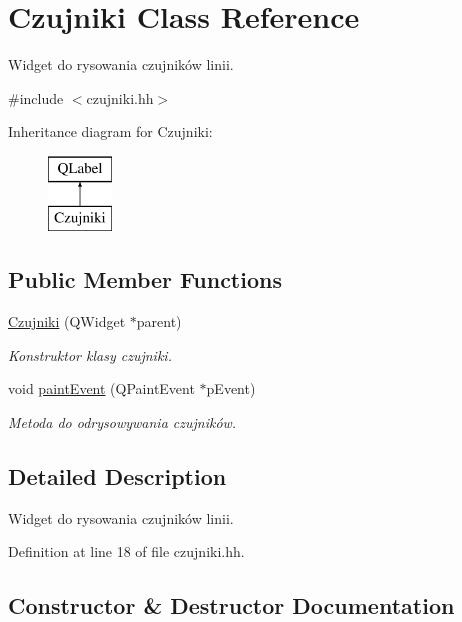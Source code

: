 \hypertarget{class_czujniki}{}\section{Czujniki Class Reference}
\label{class_czujniki}


Widget do rysowania czujników linii.  




{\ttfamily \#include $<$czujniki.\+hh$>$}

Inheritance diagram for Czujniki\+:\begin{figure}[H]
\begin{center}
\leavevmode
\includegraphics[height=2.000000cm]{class_czujniki}
\end{center}
\end{figure}
\subsection*{Public Member Functions}
\begin{DoxyCompactItemize}
\item 
\hyperlink{class_czujniki_a1b3e6e1807e19db4bca1a7c5f86bb30d}{Czujniki} (Q\+Widget $\ast$parent)
\begin{DoxyCompactList}\small\item\em Konstruktor klasy czujniki. \end{DoxyCompactList}\item 
void \hyperlink{class_czujniki_a3bb54c1cca3ba30b92143129f38637e9}{paint\+Event} (Q\+Paint\+Event $\ast$p\+Event)
\begin{DoxyCompactList}\small\item\em Metoda do odrysowywania czujników. \end{DoxyCompactList}\end{DoxyCompactItemize}


\subsection{Detailed Description}
Widget do rysowania czujników linii. 

Definition at line 18 of file czujniki.\+hh.



\subsection{Constructor \& Destructor Documentation}
